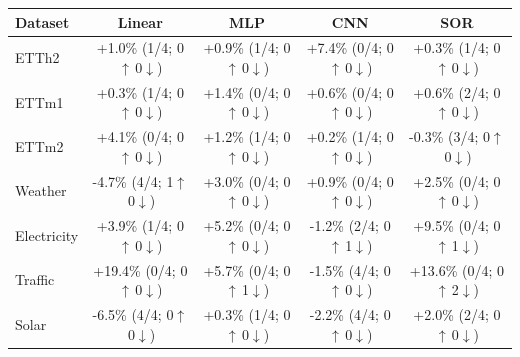 \begin{tabular}{lcccc}
\toprule
\textbf{Dataset} & \textbf{Linear} & \textbf{MLP} & \textbf{CNN} & \textbf{SOR} \\
\midrule
ETTh2 & +1.0\% (1/4; 0$\uparrow$\,0$\downarrow$) & +0.9\% (1/4; 0$\uparrow$\,0$\downarrow$) & +7.4\% (0/4; 0$\uparrow$\,0$\downarrow$) & +0.3\% (1/4; 0$\uparrow$\,0$\downarrow$) \\
ETTm1 & +0.3\% (1/4; 0$\uparrow$\,0$\downarrow$) & +1.4\% (0/4; 0$\uparrow$\,0$\downarrow$) & +0.6\% (0/4; 0$\uparrow$\,0$\downarrow$) & +0.6\% (2/4; 0$\uparrow$\,0$\downarrow$) \\
ETTm2 & +4.1\% (0/4; 0$\uparrow$\,0$\downarrow$) & +1.2\% (1/4; 0$\uparrow$\,0$\downarrow$) & +0.2\% (1/4; 0$\uparrow$\,0$\downarrow$) & -0.3\% (3/4; 0$\uparrow$\,0$\downarrow$) \\
Weather & -4.7\% (4/4; 1$\uparrow$\,0$\downarrow$) & +3.0\% (0/4; 0$\uparrow$\,0$\downarrow$) & +0.9\% (0/4; 0$\uparrow$\,0$\downarrow$) & +2.5\% (0/4; 0$\uparrow$\,0$\downarrow$) \\
Electricity & +3.9\% (1/4; 0$\uparrow$\,0$\downarrow$) & +5.2\% (0/4; 0$\uparrow$\,0$\downarrow$) & -1.2\% (2/4; 0$\uparrow$\,1$\downarrow$) & +9.5\% (0/4; 0$\uparrow$\,1$\downarrow$) \\
Traffic & +19.4\% (0/4; 0$\uparrow$\,0$\downarrow$) & +5.7\% (0/4; 0$\uparrow$\,1$\downarrow$) & -1.5\% (4/4; 0$\uparrow$\,0$\downarrow$) & +13.6\% (0/4; 0$\uparrow$\,2$\downarrow$) \\
Solar & -6.5\% (4/4; 0$\uparrow$\,0$\downarrow$) & +0.3\% (1/4; 0$\uparrow$\,0$\downarrow$) & -2.2\% (4/4; 0$\uparrow$\,0$\downarrow$) & +2.0\% (2/4; 0$\uparrow$\,0$\downarrow$) \\
\bottomrule
\end{tabular}

